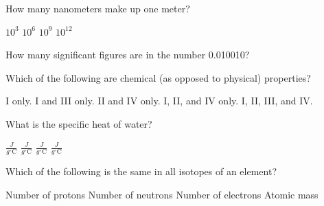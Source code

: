 \documentclass[11pt]{exam}
\begin{document}
\begin{questions}

\renewcommand{\theenumi}{\Roman{enumi}}
\renewcommand{\labelenumi}{\theenumi}

\question How many nanometers make up one meter?
\begin{choices}
    \choice $10^3$
    \choice $10^6$
    \choice $10^9$
    \choice $10^{12}$
\end{choices}
\answerline

\question How many significant figures are in the number 0.010010?
\begin{choices}
\end{choices}
\answerline

\question Which of the following are chemical (as opposed to physical) properties?

\hspace{.5cm}

\begin{choices}
    \choice I only.
    \choice I and III only.
    \choice II and IV only.
    \choice I, II, and IV only.
    \choice I, II, III, and IV.
\end{choices}
\answerline

\question What is the specific heat of water?
\begin{choices}
     $\frac{J}{g ^{\circ}\mathrm{C}}$
     $\frac{J}{g ^{\circ}\mathrm{C}}$
     $\frac{J}{g ^{\circ}\mathrm{C}}$
     $\frac{J}{g ^{\circ}\mathrm{C}}$
\end{choices}
\answerline

\pagebreak
\question Which of the following is the same in all isotopes of an element?

\begin{choices}
    \choice Number of protons
    \choice Number of neutrons
    \choice Number of electrons
    \choice Atomic mass
\end{choices}
\answerline


\end{questions}
\end{document}
